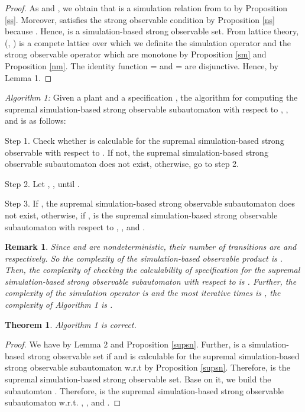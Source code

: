 \documentclass[12pt,draftcls,onecolumn]{IEEEtran}
\newtheorem{Theorem}{Theorem}
\newtheorem{Remark}{Remark}
\begin{document}
\begin{proof}
As  and , we obtain that  is a
simulation relation from  to  by Proposition \ref{ss}.
Moreover,  satisfies the strong observable
condition by Proposition \ref{ns} because . Hence,  is a
simulation-based strong observable set. From lattice theory,
(, ) is a compete lattice over which we
definite the simulation operator  and the strong observable
operator  which are monotone by Proposition \ref{sm} and
Proposition \ref{nm}. The identity function  =
 and  =  are
disjunctive. Hence,  by Lemma 1.
\end{proof}

{\it Algorithm 1: } Given a plant 
and a specification , the
algorithm for computing the supremal simulation-based strong
observable subautomaton with respect to , , and  is
as follows:

Step 1. Check whether  is calculable for the supremal
simulation-based strong observable with respect to . If not,
the supremal simulation-based strong observable subautomaton does
not exist, otherwise, go to step 2.

Step 2. Let , ,  until .

Step 3. If , the supremal simulation-based
strong observable subautomaton does not exist, otherwise, if
  ,  is the supremal
simulation-based strong observable subautomaton with respect to
, , and .



\begin{Remark}
Since  and  are nondeterministic, their number of
transitions are  and  respectively. So the complexity of the simulation-based
observable product is . Then, the complexity of checking the
calculability of specification  for the supremal
simulation-based strong observable subautomaton with respect to
 is . Further, the complexity of the simulation
operator is  and the most
iterative times is , the complexity of Algorithm 1
is .
\end{Remark}



\begin{Theorem}
Algorithm 1 is correct.
\end{Theorem}
\begin{proof}
We have  by Lemma 2 and Proposition \ref{supsn}.
Further,  is a simulation-based strong observable set if
 and  is calculable for the supremal
simulation-based strong observable subautomaton w.r.t  by
Proposition \ref{supsn}. Therefore,  is the supremal
simulation-based strong observable set. Base on it, we build the
subautomton . Therefore,  is the supremal
simulation-based strong observable subautomaton w.r.t. ,
, and .
\end{proof}
\end{document}
